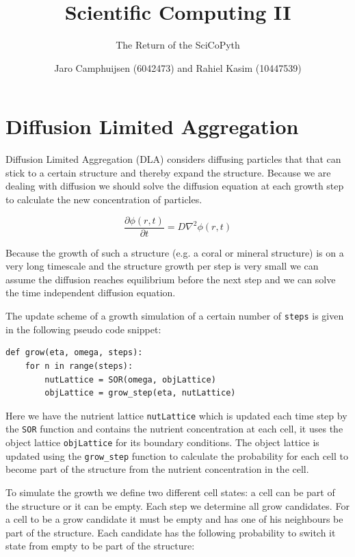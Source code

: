 \documentclass[a4paper]{article}
\author{Jaro Camphuijsen (6042473) and Rahiel Kasim (10447539)}
\title{Scientific Computing II}
\subtitle{The Return of the SciCoPyth}
\begin{document}
\maketitle

\tableofcontents

\section{Diffusion Limited Aggregation}
Diffusion Limited Aggregation (DLA) considers diffusing particles that that can stick to a certain structure and thereby expand the structure. Because we are dealing with diffusion we should solve the diffusion equation at each growth step to calculate the new concentration of particles. 

\begin{equation}
\frac{\partial \phi (r,t)}{\partial  t} = D \nabla ^2 \phi (r,t)
\label{eq:diff}
\end{equation}

Because the growth of such a structure (e.g. a coral or mineral structure) is on a very long timescale and the structure growth per step is very small we can assume the diffusion reaches equilibrium before the next step and we can solve the time independent diffusion equation. 

The update scheme of a growth simulation of a certain number of \texttt{steps} is given in the following pseudo code snippet:

\begin{verbatim}
def grow(eta, omega, steps):
    for n in range(steps):
        nutLattice = SOR(omega, objLattice)
        objLattice = grow_step(eta, nutLattice)
\end{verbatim}

Here we have the nutrient lattice \texttt{nutLattice} which is updated each time step by the \texttt{SOR} function and contains the nutrient concentration at each cell, it uses the object lattice \texttt{objLattice} for its boundary conditions. The object lattice is updated using the \texttt{grow_step} function to calculate the probability for each cell to become part of the structure from the nutrient concentration in the cell. 

To simulate the growth we define two different cell states: a cell can be part of the structure or it can be empty. Each step we determine all grow candidates. For a cell to be a grow candidate it must be empty and has one of his neighbours be part of the structure. Each candidate has the following probability to switch it state from empty to be part of the structure:
\end{document}
